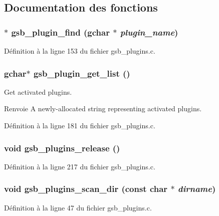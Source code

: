 \subsection{Documentation des fonctions}
\subsubsection[{gsb\_\-plugin\_\-find}]{$\ast$ gsb\_\-plugin\_\-find (gchar $\ast$ {\em plugin\_\-name})}\label{gsb__plugins_8h_ae8e42c4d6f667c7e023e555d604f42cf}


Définition à la ligne 153 du fichier gsb\_\-plugins.c.

\subsubsection[{gsb\_\-plugin\_\-get\_\-list}]{\setlength{\rightskip}{0pt plus 5cm}gchar$\ast$ gsb\_\-plugin\_\-get\_\-list ()}\label{gsb__plugins_8h_a9f59967389b32ce61da777570db3bd70}
Get activated plugins.

\begin{DoxyReturn}{Renvoie}
A newly-\/allocated string representing activated plugins. 
\end{DoxyReturn}


Définition à la ligne 181 du fichier gsb\_\-plugins.c.

\subsubsection[{gsb\_\-plugins\_\-release}]{\setlength{\rightskip}{0pt plus 5cm}void gsb\_\-plugins\_\-release ()}\label{gsb__plugins_8h_afc5867729924c1aeef67629c66ce5020}


Définition à la ligne 217 du fichier gsb\_\-plugins.c.

\subsubsection[{gsb\_\-plugins\_\-scan\_\-dir}]{\setlength{\rightskip}{0pt plus 5cm}void gsb\_\-plugins\_\-scan\_\-dir (const char $\ast$ {\em dirname})}\label{gsb__plugins_8h_a63124d64ba3d44f175f5c30ee608c1b0}


Définition à la ligne 47 du fichier gsb\_\-plugins.c.

